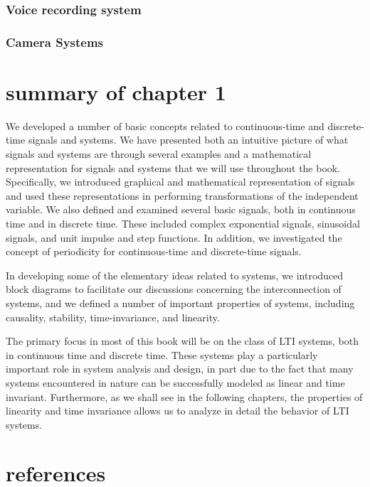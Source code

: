 \documentclass[koma,utopia,letterpaper,captions=tableheading,11pt,listings-sv,microtype,paralist,colorlinks=true,urlcolor=blue]{org-article}
\begin{document}
\subsubsection{Voice recording system}
\label{sec:org4bc4f48}

\subsubsection{Camera Systems}
\label{sec:org36b0296}

\section{summary of chapter 1}
\label{sec:org273cc92}


We developed a number of basic concepts related to continuous-time and
discrete-time signals and systems. We have presented both an intuitive picture
of what signals and systems are through several examples and a mathematical
representation for signals and systems that we will use throughout the book.
Specifically, we introduced graphical and mathematical representation of signals
and used these representations in performing transformations of the independent
variable. We also defined and examined several basic signals, both in continuous
time and in discrete time. These included complex exponential signals,
sinusoidal signals, and unit impulse and step functions. In addition, we
investigated the concept of periodicity for continuous-time and discrete-time
signals.

In developing some of the elementary ideas related to systems, we introduced
block diagrams to facilitate our discussions concerning the interconnection of
systems, and we defined a number of important properties of systems, including
causality, stability, time-invariance, and linearity.

The primary focus in most of this book will be on the class of LTI systems, both
in continuous time and discrete time. These systems play a particularly
important role in system analysis and design, in part due to the fact that many
systems encountered in nature can be successfully modeled as linear and time
invariant. Furthermore, as we shall see in the following chapters, the
properties of linearity and time invariance allows us to analyze in detail the
behavior of LTI systems.

\section{references}
\label{sec:orgc602a8b}
\end{document}
